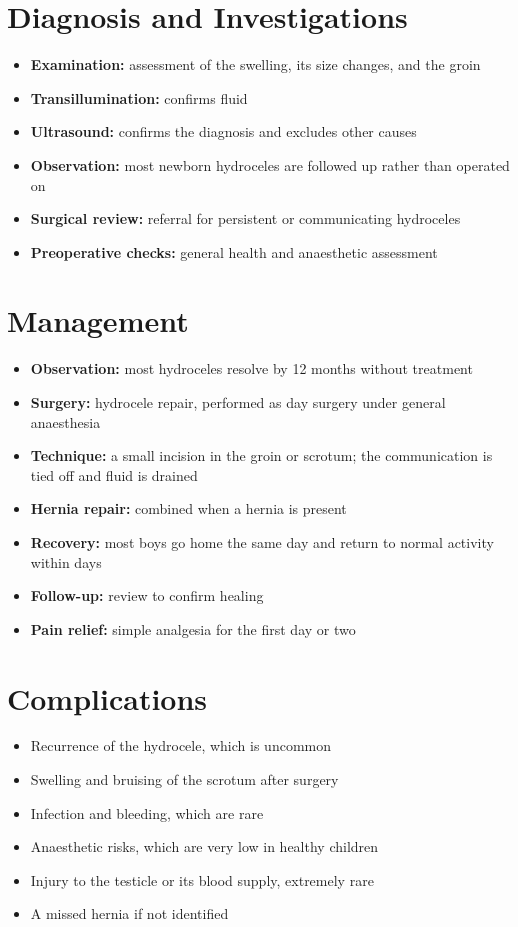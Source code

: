 \section*{Diagnosis and Investigations}
\begin{itemize}
    \item \textbf{Examination:} assessment of the swelling, its size changes, and the groin
    \item \textbf{Transillumination:} confirms fluid
    \item \textbf{Ultrasound:} confirms the diagnosis and excludes other causes
    \item \textbf{Observation:} most newborn hydroceles are followed up rather than operated on
    \item \textbf{Surgical review:} referral for persistent or communicating hydroceles
    \item \textbf{Preoperative checks:} general health and anaesthetic assessment
\end{itemize}

\section*{Management}
\begin{itemize}
    \item \textbf{Observation:} most hydroceles resolve by 12 months without treatment
    \item \textbf{Surgery:} hydrocele repair, performed as day surgery under general anaesthesia
    \item \textbf{Technique:} a small incision in the groin or scrotum; the communication is tied off and fluid is drained
    \item \textbf{Hernia repair:} combined when a hernia is present
    \item \textbf{Recovery:} most boys go home the same day and return to normal activity within days
    \item \textbf{Follow-up:} review to confirm healing
    \item \textbf{Pain relief:} simple analgesia for the first day or two
\end{itemize}

\section*{Complications}
\begin{itemize}
    \item Recurrence of the hydrocele, which is uncommon
    \item Swelling and bruising of the scrotum after surgery
    \item Infection and bleeding, which are rare
    \item Anaesthetic risks, which are very low in healthy children
    \item Injury to the testicle or its blood supply, extremely rare
    \item A missed hernia if not identified
\end{itemize}

